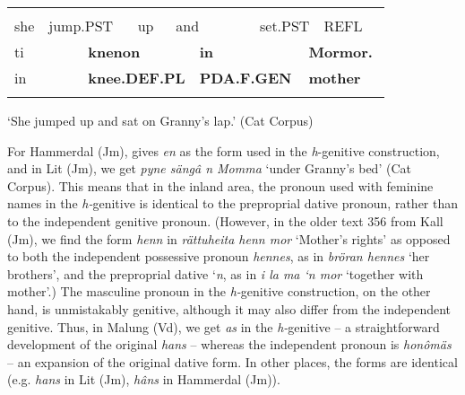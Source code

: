 \begin{tabular}{llllllllll}
\lsptoprule
\multicolumn{10}{l}{O

}\\
she & \multicolumn{2}{l}{jump.PST

} & up & \multicolumn{2}{l}{and

} & \multicolumn{2}{l}{set.PST

} & REFL & \\
\multicolumn{2}{l}{ti

} & \multicolumn{3}{l}{{\bfseries knenon}

} & \multicolumn{2}{l}{{\bfseries in}

} & \multicolumn{3}{l}{{\bfseries Mormor.}

}\\
\multicolumn{2}{l}{in

} & \multicolumn{3}{l}{{\bfseries knee.DEF.PL}

} & \multicolumn{2}{l}{{\bfseries PDA.F.GEN}

} & \multicolumn{3}{l}{{\bfseries mother}

}\\
\lspbottomrule
\end{tabular}

\begin{styleTranslation}
‘She jumped up and sat on Granny’s lap.’ (Cat Corpus)

\end{styleTranslation}

\begin{styleBodyTextFirst}
For Hammerdal (Jm), \citet{Reinhammar2005} gives \textit{en} as the form used in the \textit{h}{}-genitive construction, and in Lit (Jm), we get \textit{pyne sängâ n Momma} ‘under Granny’s bed’ (Cat Corpus). This means that in the inland area, the pronoun used with feminine names in the \textit{h-}genitive is identical to the preproprial dative pronoun, rather than to the independent genitive pronoun. (However, in the older text 356 from Kall (Jm), we find the form \textit{henn} in \textit{rättuheita henn mor} ‘Mother’s rights’ as opposed to both the independent possessive pronoun \textit{hennes}, as in \textit{bröran hennes} ‘her brothers’, and the preproprial dative ‘\textit{n}, as in \textit{i la ma ‘n mor} ‘together with mother’.) The masculine pronoun in the \textit{h-}genitive construction, on the other hand, is unmistakably genitive, although it may also differ from the independent genitive. Thus, in Malung (Vd), we get \textit{as} in the \textit{h-}genitive – a straightforward development of the original \textit{hans} – whereas the independent pronoun is \textit{honômäs} – an expansion of the original dative form. In other places, the forms are identical (e.g. \textit{hans} in Lit (Jm), \textit{hâns} in Hammerdal (Jm)). 

\end{styleBodyTextFirst}

